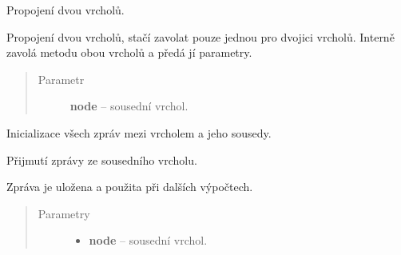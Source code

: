 \begin{fulllineitems}
\begin{fulllineitems}
\begin{quote}
\begin{description}
\end{description}\end{quote}

\end{fulllineitems}


\begin{fulllineitems}
\label{alex.infer:alex.infer.factor.alex.infer.node.DiscreteFactorNode.connect}
Propojení dvou vrcholů.

Propojení dvou vrcholů, stačí zavolat pouze jednou pro dvojici vrcholů.
Interně zavolá metodu {\hyperref[alex.infer:alex.infer.factor.alex.infer.node.DiscreteFactorNode.add_neighbor]{}} obou vrcholů a předá jí parametry.
\begin{quote}\begin{description}
\item[{Parametr}] \leavevmode
\textbf{node} -- sousední vrchol.

\end{description}\end{quote}

\end{fulllineitems}


\begin{fulllineitems}
\label{alex.infer:alex.infer.factor.alex.infer.node.DiscreteFactorNode.init_messages}
Inicializace všech zpráv mezi vrcholem a jeho sousedy.

\end{fulllineitems}


\begin{fulllineitems}
\label{alex.infer:alex.infer.factor.alex.infer.node.DiscreteFactorNode.message_from}
Přijmutí zprávy ze sousedního vrcholu.

Zpráva je uložena a použita při dalších výpočtech.
\begin{quote}\begin{description}
\item[{Parametry}] \leavevmode\begin{itemize}
\item {} 
\textbf{node} -- sousední vrchol.


\end{itemize}
\end{description}
\end{quote}
\end{fulllineitems}
\end{fulllineitems}

